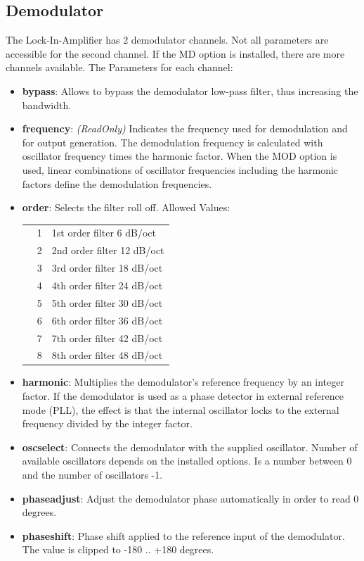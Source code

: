 \documentclass[11pt]{article} %
\begin{document}
\subsection{Demodulator}
	The Lock-In-Amplifier has 2 demodulator channels. Not all parameters are accessible for the second channel. If the MD option is installed, there are more channels available. The Parameters for each channel:
	\begin{itemize}
	\item {\bf bypass}: Allows to bypass the demodulator low-pass filter, thus increasing the bandwidth.
	\item {\bf frequency}: {\it (ReadOnly)} Indicates the frequency used for demodulation and for output generation. The demodulation frequency is calculated with oscillator frequency times the harmonic factor. When the MOD option is used, linear combinations of oscillator frequencies including the harmonic factors define the demodulation frequencies.
	\item {\bf order}: Selects the filter roll off. Allowed Values:
	\begin{longtable}{p{1.5cm}p{1cm}p{14cm}}
	& 1 & 1st order filter 6 dB/oct \\
	& 2 & 2nd order filter 12 dB/oct \\
	& 3 & 3rd order filter 18 dB/oct \\
	& 4 & 4th order filter 24 dB/oct \\
	& 5 & 5th order filter 30 dB/oct \\
	& 6 & 6th order filter 36 dB/oct \\
	& 7 & 7th order filter 42 dB/oct \\
	& 8 & 8th order filter 48 dB/oct \\
	\end{longtable}
	\item {\bf harmonic}: Multiplies the demodulator's reference frequency by an integer factor. If the demodulator is used as a phase detector in external reference mode (PLL), the effect is that the internal oscillator locks to the external frequency divided by the integer factor.
	\item {\bf oscselect}: Connects the demodulator with the supplied oscillator. Number of available oscillators depends on the installed options. Is a number between 0 and the number of oscillators -1.
	\item {\bf phaseadjust}: Adjust the demodulator phase automatically in order to read 0 degrees.
	\item {\bf phaseshift}: Phase shift applied to the reference input of the demodulator. The value is clipped to -180 .. +180 degrees.

\end{itemize}
\end{document}
